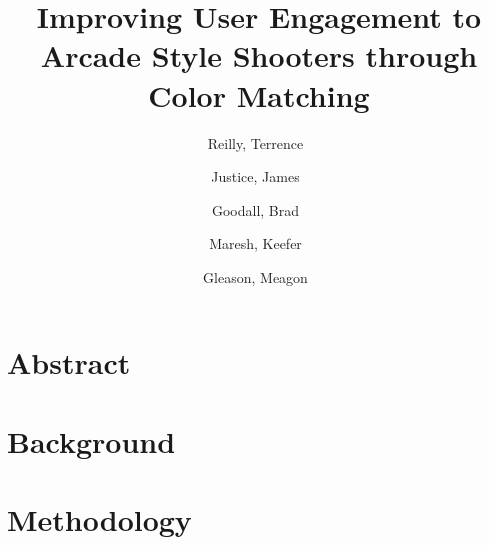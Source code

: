 \documentclass[letterpaper,12pt]{article}
\author{
    Reilly, Terrence\
    \and
    Justice, James\
    \and
    Goodall, Brad\
    \and
    Maresh, Keefer\
    \and
    Gleason, Meagon\
}
\title{Improving User Engagement to Arcade Style Shooters through Color Matching}
\begin{document}
    \linespread{1.5}
    \twocolumn
    \sloppy
    \nocite{*}
    \maketitle

    \section*{Abstract}
    

    \section*{Background}
    

    \section*{Methodology}
    

    \onecolumn
    
    
\end{document}
